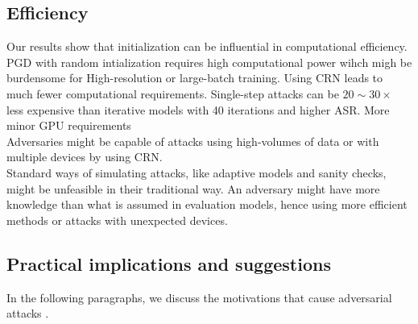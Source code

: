 \subsection{Efficiency}
Our results show that initialization can be influential in computational efficiency. PGD with random intialization requires high computational power wihch migh be burdensome for High-resolution or large-batch training. Using CRN leads to much fewer computational requirements. Single-step attacks can be $20 \sim 30 \times$ less expensive than iterative models with 40 iterations and higher ASR. 
More minor GPU requirements \\Adversaries might be capable of attacks using high-volumes of data or with multiple devices by using CRN.
\\Standard ways of simulating attacks, like adaptive models and sanity checks, \cite{carlini2019evaluating} might be unfeasible in their traditional way. An adversary might have more knowledge than what is assumed in evaluation models, hence using more efficient methods or attacks with unexpected devices.



\subsection{Practical implications and suggestions}

In the following paragraphs, we discuss the motivations that cause adversarial attacks .

